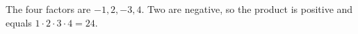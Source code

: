 The four factors are $-1,2,-3,4$. Two are negative, so the product is positive and equals $1\cdot2\cdot3\cdot4=\boxed{24}$.
